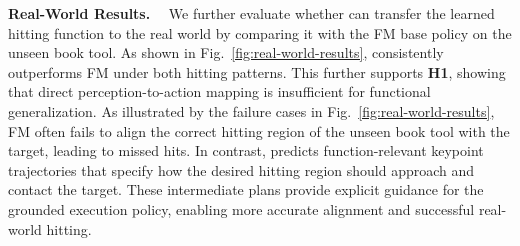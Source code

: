 \textbf{Real-World Results.}~~
We further evaluate whether \algoname{} can transfer the learned hitting function to the real world by comparing it with the FM base policy on the unseen book tool.
As shown in Fig.~\ref{fig:real-world-results}, \algoname{} consistently outperforms FM under both hitting patterns.
This further supports \textbf{H1}, showing that direct perception-to-action mapping is insufficient for functional generalization. As illustrated by the failure cases in Fig.~\ref{fig:real-world-results}, FM often fails to align the correct hitting region of the unseen book tool with the target, leading to missed hits.
In contrast, \algoname{} predicts function-relevant keypoint trajectories that specify how the desired hitting region should approach and contact the target.
These intermediate plans provide explicit guidance for the grounded execution policy, enabling more accurate alignment and successful real-world hitting.


















